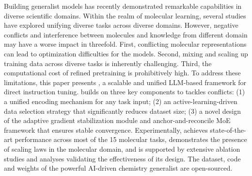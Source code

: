 Building generalist models has recently demonstrated remarkable capabilities in diverse scientific domains. Within the realm of molecular learning, several studies have explored unifying diverse tasks across diverse domains. However, negative conflicts and interference between molecules and knowledge from different domain may have a worse impact in threefold. First, conflicting molecular representations can lead to optimization difficulties for the models. Second, mixing and scaling up training data across diverse tasks is inherently challenging. Third, the computational cost of refined pretraining is prohibitively high. 
To address these limitations, this paper presents \textbf{\method}, a scalable and unified LLM-based framework for direct instruction tuning. \method builds on three key components to tackles conflicts: (1) a unified encoding mechanism for any task input; (2) an active-learning-driven data selection strategy that significantly reduces dataset size; (3) a novel design of the adaptive gradient stabilization module and anchor-and-reconcile MoE framework that ensures stable convergence. Experimentally, \method achieves state-of-the-art performance across most of the 15 molecular tasks, demonstrates the presence of scaling laws in the molecular domain, and is supported by extensive ablation studies and analyses validating the effectiveness of its design. 
The dataset, code and weights of the powerful AI-driven chemistry generalist are open-sourced.